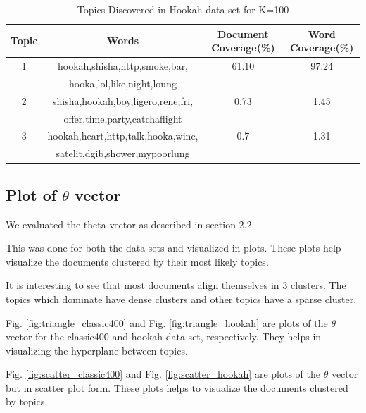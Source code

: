 \documentclass[11pt,a4paper,oneside]{article}
\begin{document}
\begin{table}
\begin{tabular}{|c|c|c|c|}
\hline 
Topic & Words & Document Coverage(\%) & Word Coverage(\%) \\ 
\hline 
1 & hookah,shisha,http,smoke,bar, & 61.10 & 97.24 \\ 
& hooka,lol,like,night,loung & & \\
\hline 
2 & shisha,hookah,boy,ligero,rene,fri, & 0.73 & 1.45 \\ 
& offer,time,party,catchaflight & & \\
\hline 
3 & hookah,heart,http,talk,hooka,wine, & 0.7 & 1.31 \\ 
& satelit,dgib,shower,mypoorlung & & \\
\hline 
\end{tabular}
\caption{Topics Discovered in Hookah data set for K=100}
\label{table:k=100_hookah}
\end{table}


\subsection{Plot of $\theta$ vector}
We evaluated the theta vector as described in section 2.2.

This was done for both the data sets and visualized in plots. These plots help visualize the documents clustered by their most likely topics. 

It is interesting to see that most documents align themselves in 3 clusters. The topics which dominate have dense clusters and other topics have a sparse cluster.

Fig. \ref{fig:triangle_classic400} and Fig. \ref{fig:triangle_hookah} are plots of the $\theta$ vector for the classic400 and hookah data set, respectively. They helps in visualizing the hyperplane between topics. 

Fig. \ref{fig:scatter_classic400} and Fig. \ref{fig:scatter_hookah} are plots of the $\theta$ vector but in scatter plot form. These plots helps to visualize the documents clustered by topics.
\end{document}
